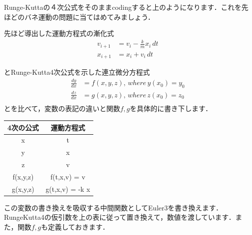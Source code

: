 \documentclass[11pt,dvipdfmx]{jsarticle}
\begin{document}
    Runge-Kuttaの４次公式をそのままcodingすると上のようになります．これを先ほどのバネ運動の問題に当てはめてみましょう．

先ほど導出した運動方程式の漸化式 \[
\begin{aligned}
v_{i+1} & = v_i - \frac{k}{m} x_i\, dt \\
x_{i+1} & = x_i + v_i\, dt
\end{aligned}
\]

とRunge-Kutta4次公式を示した連立微分方程式 \[
\begin{aligned}
\frac{dy}{dx} &= f(x,y,z), \, where \, y(x_0)=y_0 \\
\frac{dz}{dx} &= g(x,y,z), \, where \, z(x_0)=z_0 \\
\end{aligned}
\] とを比べて，変数の表記の違いと関数\(f,g\)を具体的に書き下します．

\begin{longtable}[]{@{}cc@{}}
\toprule
4次の公式 & 運動方程式\tabularnewline
\midrule
\endhead
x & t\tabularnewline
y & x\tabularnewline
z & v\tabularnewline
f(x,y,z) & f(t,x,v) = v\tabularnewline
g(x,y,z) & g(t,x,v) = -k x\tabularnewline
\bottomrule
\end{longtable}

この変数の書き換えを吸収する中間関数としてEuler3を書き換えます．RungeKutta4の仮引数を上の表に従って置き換えて，数値を渡しています．また，関数\(f,g\)も定義しておきます．
\end{document}
